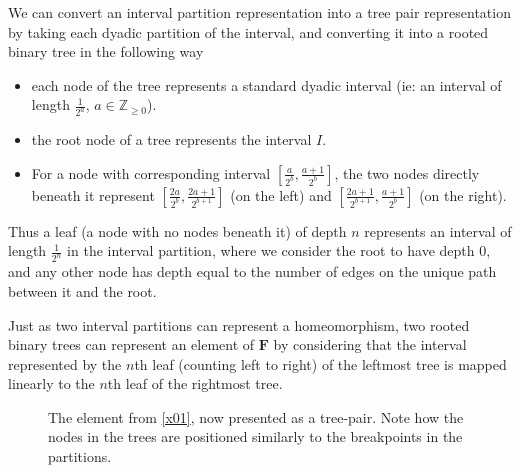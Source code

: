 \documentclass[
11pt, %
english, %
singlespacing, %
parskip, %
headsepline, %
]{amsart} %
\theoremstyle{definition}
\newcommand{\TF}{\textbf{F}}
\newcommand{\drawcaret}[2]{\draw (#1,#2) -- (#1-0.5,#2-1); \draw (#1,#2) -- (#1+0.5,#2-1)}
\begin{document}
We can convert an interval partition representation into a tree pair representation by taking each dyadic partition of the interval, and converting it into a rooted binary tree in the following way

\begin{itemize}
\item each node of the tree represents a standard dyadic interval (ie: an interval of length $\frac{1}{2^a}$, $a \in \mathbb{Z}_{\geq 0}$).
\item the root node of a tree represents the interval $I$.
\item For a node with corresponding interval $[\frac{a}{2^b}, \frac{a+1}{2^b}]$, the two nodes directly beneath it represent $[\frac{2a}{2^b},\frac{2a+1}{2^{b+1}}]$ (on the left) and $[\frac{2a+1}{2^{b+1}},\frac{a+1}{2^b}]$ (on the right).
\end{itemize} 

Thus a leaf (a node with no nodes beneath it) of depth $n$ represents an interval of length $\frac{1}{2^n}$ in the interval partition, where we consider the root to have depth $0$, and any other node has depth equal to the number of edges on the unique path between it and the root. 

Just as two interval partitions can represent a homeomorphism, two rooted binary trees can represent an element of $\TF$ by considering that the interval represented by the $n$th leaf (counting left to right) of the leftmost tree is mapped linearly to the $n$th leaf of the rightmost tree. 

\begin{center}
\begin{figure}[H]
\centering
{}
\caption{The element from \ref{x01}, now presented as a tree-pair. Note how the nodes in the trees are positioned similarly to the breakpoints in the partitions.}
\end{figure}
\end{center}
\end{document}

